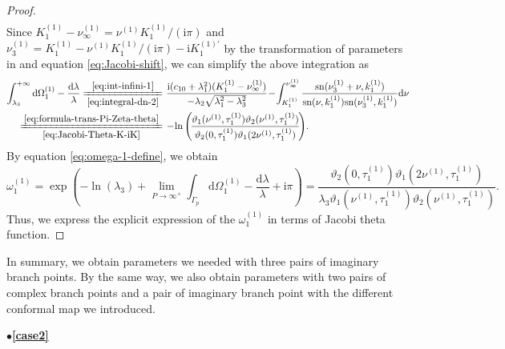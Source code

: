 \documentclass[11pt,reqno]{amsart}
\newcommand{\ii}{\mathrm{i}}
\newcommand{\sn}{\mathrm{sn}}
\newcommand{\dd}{\mathrm{d}}
\numberwithin{equation}{section}
\begin{document}
\begin{proof}
\begin{equation}
\begin{split}
		\end{split}	
	\end{equation}
	Since $  K^{(1)}_1- \nu^{(1)} _{\infty}= \nu^{(1)}   K^{(1)}_1/(\ii \pi)$ and $ \nu^{(1)} _3=  K^{(1)}_1- \nu^{(1)}   K^{(1)}_1/(\ii \pi)-\ii   K^{(1)\prime}_1$
	by the transformation of parameters in \cite{ByrdF-54} and equation \eqref{eq:Jacobi-shift}, we can simplify the above integration as 
	\begin{equation}\nonumber
		\begin{split}
			\int_{\lambda_3}^{+\infty}\dd \Omega_1^{(1)}-\frac{\dd \lambda}{\lambda}\xlongequal[\eqref{eq:integral-dn-2}]{\eqref{eq:int-infini-1}} &\ 
			\frac{\ii(c_{10}+ \lambda_1^2)(  K^{(1)} _1- \nu^{(1)} _{\infty}) }{-\lambda_2\sqrt{\lambda_1^2-\lambda_3^2}}
			\! -\! \int_{  K^{(1)}_1}^{ \nu^{(1)} _{\infty}}\frac{\sn( \nu^{(1)} _3+\nu,  k^{(1)}_1)}{\sn(\nu,  k^{(1)}_1)\sn( \nu^{(1)} _3,  k^{(1)}_1)}\dd \nu \\
			\xlongequal[\eqref{eq:Jacobi-Theta-K-iK}]{\eqref{eq:formula-trans-Pi-Zeta-theta}} &\ \! -\! \ln\left(\! \frac{\vartheta_1( \nu^{(1)} ,  \tau^{(1)} _1)\vartheta_2( \nu^{(1)} ,  \tau^{(1)} _1)}{\vartheta_2(0,  \tau^{(1)} _1)\vartheta_1(2 \nu^{(1)} ,  \tau^{(1)} _1)}\! \right)\!.
		\end{split}
	\end{equation}
	By equation \eqref{eq:omega-1-define}, we obtain
	\begin{equation}\nonumber
		\omega_1^{(1)}=\exp\left(-\ln(\lambda_3)+\lim_{ P\rightarrow \infty^{+}}\int_{\Gamma_p}\dd\Omega_1^{(1)}-\frac{\dd \lambda}{\lambda}+\ii \pi \right)=\frac{\vartheta_2(0,  \tau^{(1)} _1)\vartheta_1(2 \nu^{(1)} ,  \tau^{(1)} _1)}{\lambda_3\vartheta_1( \nu^{(1)} ,  \tau^{(1)} _1)\vartheta_2( \nu^{(1)} ,  \tau^{(1)} _1)}.
	\end{equation}
	Thus, we express the explicit expression of the $\omega_1^{(1)}$ in terms of Jacobi theta function.
\end{proof}

In summary, we obtain parameters we needed with three pairs of imaginary branch points. 
By the same way, we also obtain parameters with two pairs of complex branch points and a pair of imaginary branch point with the different conformal map we introduced.


\vspace{0.1cm}
\noindent $\bullet$\quad\textbf{\large \ref{case2}}
\end{document}
